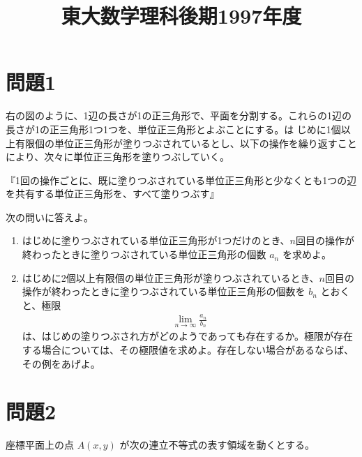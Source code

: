 \documentclass[unicode,12pt, A4j]{ltjsarticle}%
\title{東大数学理科後期1997年度}
\author{}
\date{}
\begin{document}
\maketitle

\section{問題1}
右の図のように、1辺の長さが1の正三角形で、平面を分割する。これらの1辺の長さが1の正三角形1つ1つを、単位正三角形とよぶことにする。は
じめに1個以上有限個の単位正三角形が塗りつぶされているとし、以下の操作を繰り返すことにより、次々に単位正三角形を塗りつぶしていく。

『1回の操作ごとに、既に塗りつぶされている単位正三角形と少なくとも1つの辺を共有する単位正三角形を、すべて塗りつぶす』

次の問いに答えよ。

\begin{enumerate}
 \item はじめに塗りつぶされている単位正三角形が1つだけのとき、$n$回目の操作が終わったときに塗りつぶされている単位正三角形の個数 $a_n$ を求めよ。
 \item はじめに2個以上有限個の単位正三角形が塗りつぶされているとき、$n$回目の操作が終わったときに塗りつぶされている単位正三角形の個数を $b_n$ とおくと、極限
\begin{align}
\lim_{n \to \infty} \frac{a_n}{b_n}
\end{align}
は、はじめの塗りつぶされ方がどのようであっても存在するか。極限が存在する場合については、その極限値を求めよ。存在しない場合があるならば、その例をあげよ。
\end{enumerate}

\begin{figure}[h]
\centering 
{}
\end{figure}



\section{問題2}
座標平面上の点 $A(x,y)$ が次の連立不等式の表す領域を動くとする。
\end{document}
